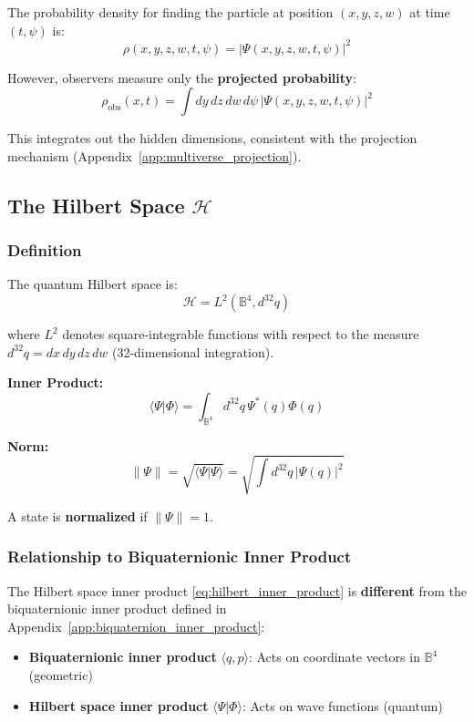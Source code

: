 The probability density for finding the particle at position $(x, y, z, w)$ at time $(t, \psi)$ is:
\begin{equation}
\rho(x, y, z, w, t, \psi) = |\Psi(x, y, z, w, t, \psi)|^2
\end{equation}

However, observers measure only the \textbf{projected probability}:
\begin{equation}
\rho_{\text{obs}}(x, t) = \int dy\,dz\,dw\,d\psi \, |\Psi(x, y, z, w, t, \psi)|^2
\end{equation}

This integrates out the hidden dimensions, consistent with the projection mechanism (Appendix~\ref{app:multiverse_projection}).

\subsection{The Hilbert Space $\mathcal{H}$}

\subsubsection{Definition}

The quantum Hilbert space is:
\begin{equation}
\mathcal{H} = L^2(\mathbb{B}^4, d^{32}q)
\end{equation}

where $L^2$ denotes square-integrable functions with respect to the measure $d^{32}q = dx\,dy\,dz\,dw$ (32-dimensional integration).

\textbf{Inner Product:}
\begin{equation}
\langle \Psi | \Phi \rangle = \int_{\mathbb{B}^4} d^{32}q \, \Psi^*(q) \Phi(q)
\label{eq:hilbert_inner_product}
\end{equation}

\textbf{Norm:}
\begin{equation}
\|\Psi\| = \sqrt{\langle \Psi | \Psi \rangle} = \sqrt{\int d^{32}q \, |\Psi(q)|^2}
\end{equation}

A state is \textbf{normalized} if $\|\Psi\| = 1$.

\subsubsection{Relationship to Biquaternionic Inner Product}

The Hilbert space inner product \eqref{eq:hilbert_inner_product} is \textbf{different} from the biquaternionic inner product defined in Appendix~\ref{app:biquaternion_inner_product}:
\begin{itemize}
\item \textbf{Biquaternionic inner product} $\langle q, p \rangle$: Acts on coordinate vectors in $\mathbb{B}^4$ (geometric)
\item \textbf{Hilbert space inner product} $\langle \Psi | \Phi \rangle$: Acts on wave functions (quantum)
\end{itemize}

